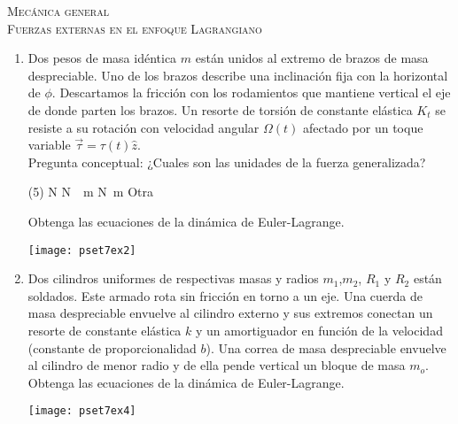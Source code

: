 \documentclass[11pt,spanish,a4paper]{article}
\begin{document}
\begin{center}
  \textsc{\large Mecánica general}\\
  \textsc{\large Fuerzas externas en el enfoque Lagrangiano}
\end{center}

\begin{enumerate}


\item 
\begin{minipage}[t][7.5cm]{0.55\textwidth}
Dos pesos de masa idéntica $m$ están unidos al extremo de brazos de masa despreciable.
Uno de los brazos describe una inclinación fija con la horizontal de $\phi$.
Descartamos la fricción con los rodamientos que mantiene vertical el eje de donde parten los brazos.
Un resorte de torsión de constante elástica $K_t$ se resiste a su rotación con velocidad angular $\Omega(t)$ afectado por un toque variable $\vec{\tau}= \tau (t) \hat{z}$.\\
Pregunta conceptual:
¿Cuales son las unidades de la fuerza generalizada?
\begin{tasks}(5)
	\task \si{\newton}
	\task \si{\newton \over \metre}
	\task \si{\newton \metre}
	\task Otra
\end{tasks}
Obtenga las ecuaciones de la dinámica de Euler-Lagrange. 
\end{minipage}
\begin{minipage}[c][0cm][t]{0.4\textwidth}
	\texttt{[image: pset7ex2]}
\end{minipage}


\item
\begin{minipage}[t][6cm]{0.6\textwidth}
Dos cilindros uniformes de respectivas masas y radios $m_1$,$m_2$, $R_1$ y $R_2$ están soldados.
Este armado rota sin fricción en torno a un eje.
Una cuerda de masa despreciable envuelve al cilindro externo y sus extremos conectan un resorte de constante elástica $k$ y un amortiguador en función de la velocidad (constante de proporcionalidad $b$).
Una correa de masa despreciable envuelve al cilindro de menor radio y de ella pende vertical un bloque de masa $m_o$.\\
Obtenga las ecuaciones de la dinámica de Euler-Lagrange. 
\end{minipage}
\begin{minipage}[c][2cm][t]{0.35\textwidth}
	\texttt{[image: pset7ex4]}
\end{minipage}



\end{enumerate}
\end{document}
